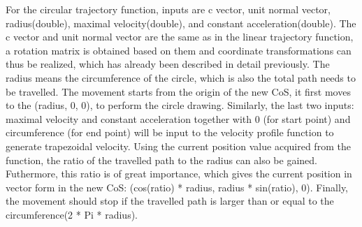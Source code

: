 For the circular trajectory function, inputs are c vector, unit normal vector, radius(double), maximal velocity(double), and constant acceleration(double). The c vector and unit normal vector are the same as in the linear trajectory function, a rotation matrix is obtained based on them and coordinate transformations can thus be realized, which has already been described in detail previously. The radius means the circumference of the circle, which is also the total path needs to be travelled. The movement starts from the origin of the new CoS, it first moves to the (radius, 0, 0), to perform the circle drawing. Similarly, the last two inputs: maximal velocity and constant acceleration together with 0 (for start point) and circumference (for end point) will be input to the velocity profile function to generate trapezoidal velocity. Using the current position value acquired from the function, the ratio of the travelled path to the radius can also be gained. Futhermore, this ratio is of great importance, which gives the current position in vector form in the new CoS: (cos(ratio) * radius, radius * sin(ratio), 0). Finally, the movement should stop if the travelled path is larger than or equal to the circumference(2 * Pi * radius).